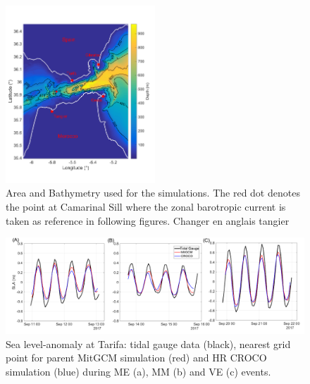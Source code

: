 \begin{figure}[!h]
        \centering
        \includegraphics[width=0.5\textwidth]{./GBR3D/FigBathyVHR.png}
        \caption{Area and Bathymetry used for the simulations. The red dot denotes the point at Camarinal Sill where the zonal barotropic current is taken as reference in following figures.  \color{green}Changer en anglais tangier \color{black}}
        \label{FigBathy3D}
\end{figure}

\begin{figure}[!h]
        \includegraphics[width=\textwidth]{./GBR3D/SLA_Tarifa_ME2VE2IES.png}
        \caption{Sea level-anomaly at Tarifa: tidal gauge data (black), nearest grid point for parent MitGCM simulation (red) and HR CROCO simulation (blue) during ME (a), MM (b) and VE (c) events.}
        \label{fig_maree_tar}
\end{figure}

